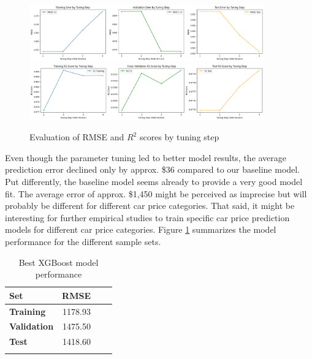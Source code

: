 \documentclass[12pt]{article}
\begin{document}
\begin{figure}[ht]
    \centering
    \includegraphics[width=0.9\textwidth]{rmse_evaluation.png}
    \includegraphics[width=0.9\textwidth]{r2_evaluation.png}
    \caption{Evaluation of RMSE and $R^2$ scores by tuning step}
    \label{performance_evaluation}
\end{figure}
\FloatBarrier

\noindent Even though the parameter tuning led to better model results, the average prediction error declined only by approx. \$36 compared to our baseline model. Put differently, the baseline model seems already to provide a very good model fit. The average error of approx. \$1,450 might be perceived as imprecise but will probably be different for different car price categories. That said, it might be interesting for further empirical studies to train specific car price prediction models for different car price categories. Figure \ref{xgboostbest} summarizes the model performance for the different sample sets.\\

\FloatBarrier
\begin{table}[h!]
    \centering
    \caption{Best XGBoost model performance}
    \begin{tabular}{>{\raggedright}p{5cm}rrr}
    \toprule
    \textbf{Set} & \textbf{RMSE} \\
    \midrule
    \textbf{Training} & 1178.93\\     
    \textbf{Validation} & 1475.50 \\
    \textbf{Test} &  1418.60 \\
    \bottomrule
     \label{xgboostbest}
    \end{tabular}
\end{table}
\FloatBarrier
\end{document}
